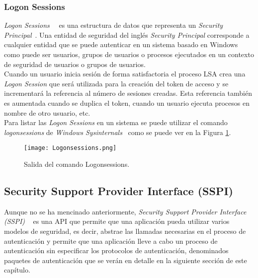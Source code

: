 \subsubsection{Logon Sessions}

{\it Logon Sessions}~\cite{Capitulo2:LogonSessions}~\cite{Capitulo2:LogonSessions2} es una estructura de datos que representa un {\it Security Principal}~\cite{Capitulo2:SecurityPrincipals}. Una entidad de seguridad del inglés {\it Security Principal} corresponde a cualquier entidad que se puede autenticar en un sistema basado en Windows como puede ser usuarios, grupos de usuarios o procesos ejecutados en un contexto de seguridad de usuarios o grupos de usuarios. \\

Cuando un usuario inicia sesión de forma satisfactoria el proceso LSA crea una {\it Logon Session} que será utilizada para la creación del token de acceso y se incrementará la referencia al número de sesiones creadas. Esta referencia también es aumentada cuando se duplica el token, cuando un usuario ejecuta procesos en nombre de otro usuario, etc. \\

Para listar las  {\it Logon Sessions} en un sistema se puede utilizar el comando {\it logonsessions} de {\it Windows Sysinternals}~\cite{Capitulo2:Sysinternals} como se puede ver en la Figura \ref{Logonsessions}.

\begin{figure}[t!] %
\begin{center}
\texttt{[image: Logonsessions.png]}
\end{center}
\caption{Salida del comando Logonsessions.}
\label{Logonsessions}
\end{figure}


\subsection{Security Support Provider Interface (SSPI)}

Aunque no se ha mencinado anteriormente, {\it Security Support Provider Interface (SSPI)} ~\cite{Capitulo2:SSPI} es una API que permite que una aplicación pueda utilizar varios modelos de seguridad, es decir, abstrae las llamadas necesarias en el proceso de autenticación y permite que una aplicación lleve a cabo un proceso de autenticación sin especificar los protocolos de autenticación, denominados paquetes de autenticación que se verán en detalle en la siguiente sección de este capítulo.\\

